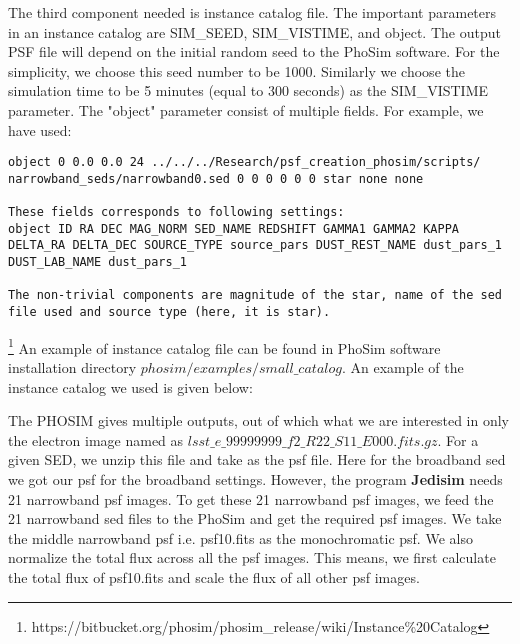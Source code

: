  The third component needed is instance catalog file. The important parameters in an instance catalog are SIM\_SEED, SIM\_VISTIME, and object.
 The output PSF file will depend on the initial random seed to the PhoSim software. For the simplicity, we choose this seed number to be 1000. Similarly we choose the simulation time to be 5 minutes (equal to 300 seconds) as the SIM\_VISTIME parameter.
The "object" parameter consist of multiple fields. For example, we have used:
\begin{verbatim}
object 0 0.0 0.0 24 ../../../Research/psf_creation_phosim/scripts/
narrowband_seds/narrowband0.sed 0 0 0 0 0 0 star none none

These fields corresponds to following settings:
object ID RA DEC MAG_NORM SED_NAME REDSHIFT GAMMA1 GAMMA2 KAPPA DELTA_RA DELTA_DEC SOURCE_TYPE source_pars DUST_REST_NAME dust_pars_1 DUST_LAB_NAME dust_pars_1

The non-trivial components are magnitude of the star, name of the sed file used and source type (here, it is star).
\end{verbatim}
\footnote{https://bitbucket.org/phosim/phosim\_release/wiki/Instance\%20Catalog}
An example of instance catalog file can be found in PhoSim software
installation directory $phosim/examples/small\_catalog$.
An example of the instance catalog we used is given below: 


The PHOSIM gives multiple outputs, out of which what we are interested in only the electron image named as $lsst\_e\_99999999\_f2\_R22\_S11\_E000.fits.gz$. For a given SED, we unzip this file and take as the psf file. Here for the broadband sed we got our psf for the broadband settings. However, the program \textbf{Jedisim} needs 21 narrowband psf images. To get these 21 narrowband psf images, we feed the 21 narrowband sed files to the PhoSim and get the required psf images. We take the middle narrowband psf i.e. psf10.fits as the monochromatic psf. We also normalize the total flux across all the psf images. This means, we first calculate the total flux of psf10.fits and scale the flux of all other psf images.

